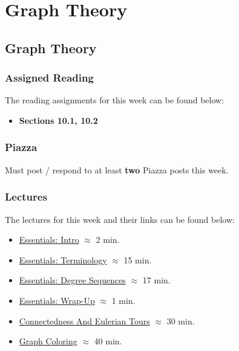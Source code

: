 \clearpage

\renewcommand{\ChapTitle}{Graph Theory}
\renewcommand{\SectionTitle}{Graph Theory}

\chapter{\ChapTitle}
\section{\SectionTitle}

\subsection{Assigned Reading}

The reading assignments for this week can be found below:

\begin{itemize}
    \item \textbf{Sections 10.1, 10.2}
\end{itemize}

\subsection{Piazza}

Must post / respond to at least \textbf{two} Piazza posts this week.  

\subsection{Lectures}

The lectures for this week and their links can be found below:

\begin{itemize}
    \item \href{https://applied.cs.colorado.edu/mod/hvp/view.php?id=51873}{Essentials: Intro} $\approx$ 2 min.
    \item \href{https://applied.cs.colorado.edu/mod/hvp/view.php?id=51874}{Essentials: Terminology} $\approx$ 15 min.
    \item \href{https://applied.cs.colorado.edu/mod/hvp/view.php?id=51875}{Essentials: Degree Sequences} $\approx$ 17 min.
    \item \href{https://applied.cs.colorado.edu/mod/hvp/view.php?id=51876}{Essentials: Wrap-Up} $\approx$ 1 min.
    \item \href{https://applied.cs.colorado.edu/mod/hvp/view.php?id=51877}{Connectedness And Eulerian Tours} $\approx$ 30 min.
    \item \href{https://applied.cs.colorado.edu/mod/hvp/view.php?id=51878}{Graph Coloring} $\approx$ 40 min.
\end{itemize}

